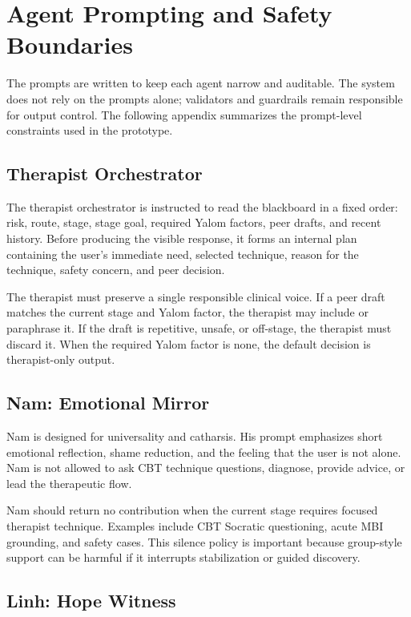 \chapter{Agent Prompting and Safety Boundaries}

The prompts are written to keep each agent narrow and auditable. The system does not rely on the prompts alone; validators and guardrails remain responsible for output control. The following appendix summarizes the prompt-level constraints used in the prototype.

\section{Therapist Orchestrator}

The therapist orchestrator is instructed to read the blackboard in a fixed order: risk, route, stage, stage goal, required Yalom factors, peer drafts, and recent history. Before producing the visible response, it forms an internal plan containing the user's immediate need, selected technique, reason for the technique, safety concern, and peer decision.

The therapist must preserve a single responsible clinical voice. If a peer draft matches the current stage and Yalom factor, the therapist may include or paraphrase it. If the draft is repetitive, unsafe, or off-stage, the therapist must discard it. When the required Yalom factor is none, the default decision is therapist-only output.

\section{Nam: Emotional Mirror}

Nam is designed for universality and catharsis. His prompt emphasizes short emotional reflection, shame reduction, and the feeling that the user is not alone. Nam is not allowed to ask CBT technique questions, diagnose, provide advice, or lead the therapeutic flow.

Nam should return no contribution when the current stage requires focused therapist technique. Examples include CBT Socratic questioning, acute MBI grounding, and safety cases. This silence policy is important because group-style support can be harmful if it interrupts stabilization or guided discovery.

\section{Linh: Hope Witness}

